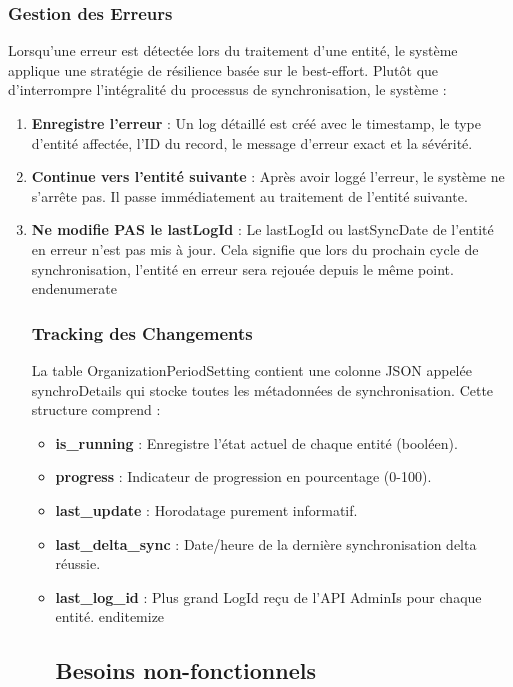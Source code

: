 \subsubsection{Gestion des Erreurs}

Lorsqu'une erreur est détectée lors du traitement d'une entité, le système applique une stratégie de résilience basée sur le best-effort. Plutôt que d'interrompre l'intégralité du processus de synchronisation, le système :

\begin{enumerate}
    \item \textbf{Enregistre l'erreur} : Un log détaillé est créé avec le timestamp, le type d'entité affectée, l'ID du record, le message d'erreur exact et la sévérité.
    
    \item \textbf{Continue vers l'entité suivante} : Après avoir loggé l'erreur, le système ne s'arrête pas. Il passe immédiatement au traitement de l'entité suivante.
    
    \item \textbf{Ne modifie PAS le lastLogId} : Le lastLogId ou lastSyncDate de l'entité en erreur n'est pas mis à jour. Cela signifie que lors du prochain cycle de synchronisation, l'entité en erreur sera rejouée depuis le même point.
end{enumerate}

\subsubsection{Tracking des Changements}

La table OrganizationPeriodSetting contient une colonne JSON appelée synchroDetails qui stocke toutes les métadonnées de synchronisation. Cette structure comprend :

\begin{itemize}
    \item \textbf{is_running} : Enregistre l'état actuel de chaque entité (booléen).
    \item \textbf{progress} : Indicateur de progression en pourcentage (0-100).
    \item \textbf{last_update} : Horodatage purement informatif.
    \item \textbf{last_delta_sync} : Date/heure de la dernière synchronisation delta réussie.
    \item \textbf{last_log_id} : Plus grand LogId reçu de l'API AdminIs pour chaque entité.
end{itemize}

\subsection{Besoins non-fonctionnels}


\end{itemize}
\end{enumerate}
